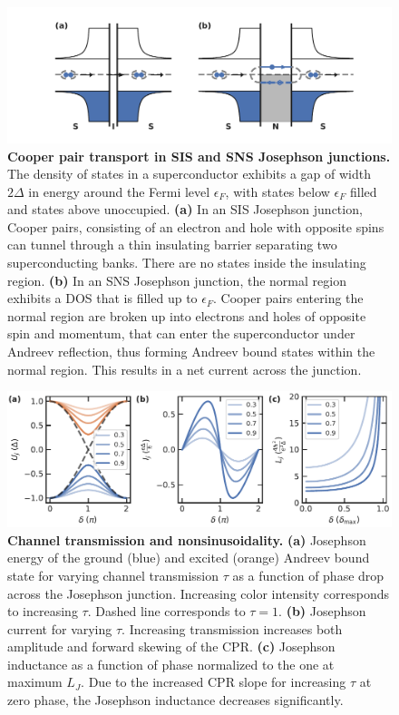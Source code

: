 \begin{figure}
	\centering
	\includegraphics[width=\linewidth]{chapter-introduction/figs/model_SNS_DOS}
	\caption{
		\textbf{Cooper pair transport in SIS and SNS Josephson junctions.}
		The density of states in a superconductor exhibits a gap of width $2\Delta$ in energy around the Fermi level $\epsilon_F$, with states below $\epsilon_F$ filled and states above unoccupied.
		\textbf{(a)} In an SIS Josephson junction, Cooper pairs, consisting of an electron and hole with opposite spins can tunnel through a thin insulating barrier separating two superconducting banks.
		There are no states inside the insulating region.
		\textbf{(b)} In an SNS Josephson junction, the normal region exhibits a DOS that is filled up to $\epsilon_F$.
		Cooper pairs entering the normal region are broken up into electrons and holes of opposite spin and momentum, that can enter the superconductor under Andreev reflection, thus forming Andreev bound states within the normal region.
		This results in a net current across the junction.
	}
	\label{fig:modelsnsdos}
\end{figure}

\begin{figure}
	\centering
	\includegraphics[width=\linewidth]{chapter-introduction/figs/model_SNS_EjIc}
	\caption{
		\textbf{Channel transmission and nonsinusoidality.}
		\textbf{(a)} Josephson energy of the ground (blue) and excited (orange) Andreev bound state for varying channel transmission $\tau$ as a function of phase drop across the Josephson junction.
		Increasing color intensity corresponds to increasing $\tau$.
		Dashed line corresponds to $\tau=1$.
		\textbf{(b)} Josephson current for varying $\tau$.
		Increasing transmission increases both amplitude and forward skewing of the CPR.
		\textbf{(c)} Josephson inductance as a function of phase normalized to the one at maximum $L_J$.
		Due to the increased CPR slope for increasing $\tau$ at zero phase, the Josephson inductance decreases significantly.
	}
	\label{fig:modelsnsejic}
\end{figure}


